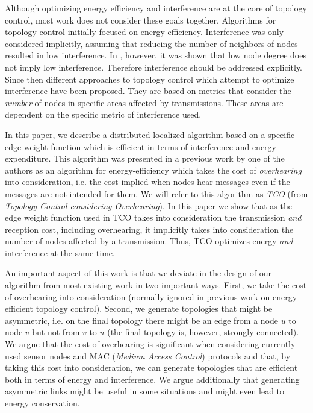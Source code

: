 \documentclass{llncs}
\begin{document}
Although optimizing energy efficiency and interference are at the core of topology control, most work does not consider these goals together.
Algorithms for topology control initially focused on energy efficiency. Interference was only considered implicitly, assuming that reducing the number
of neighbors of nodes resulted in low interference. In \cite{burkhart2004}, however, it was shown that low node degree does not imply low interference.
Therefore interference should be addressed explicitly. Since then different approaches
to topology control which attempt to optimize interference have been proposed. They are based on metrics that consider the \emph{number} of
nodes in specific areas affected by transmissions. These areas are dependent on the specific metric of interference
used.

In this paper, we describe a distributed localized algorithm based on a specific edge weight function which is efficient in terms of interference and energy expenditure.
This algorithm was presented in a previous work by one of the authors \cite{Assis09} 
as an algorithm for energy-efficiency which takes the cost of \emph{overhearing}
into consideration, i.e. the cost implied when nodes hear messages even if the messages are not intended for them. We will refer to this algorithm as \emph{TCO}
(from \emph{Topology Control considering Overhearing}).
In this paper we show that as the edge weight function used in TCO takes into consideration the transmission \emph{and} reception cost, including overhearing, it 
implicitly takes into consideration the number of nodes affected by a transmission. Thus, TCO optimizes energy \emph{and} interference at the same time. 

An important aspect of this work is that we deviate in the design of our algorithm from most existing work in two important ways. First, we take the cost of
overhearing into consideration (normally ignored in previous work on energy-efficient topology control). Second, we generate topologies that might be
asymmetric, i.e. on the final topology there might be an edge from a node $u$ to node $v$ but not from $v$ to $u$ (the final topology is, however,
strongly connected). We argue that the cost of overhearing is significant when considering currently used sensor nodes and MAC (\emph{Medium Access Control}) 
protocols and that, by taking this cost into consideration, we can generate topologies that are efficient both in terms of energy and interference. 
We argue additionally that generating asymmetric links might be useful in some situations and might even lead to energy conservation.
\end{document}
